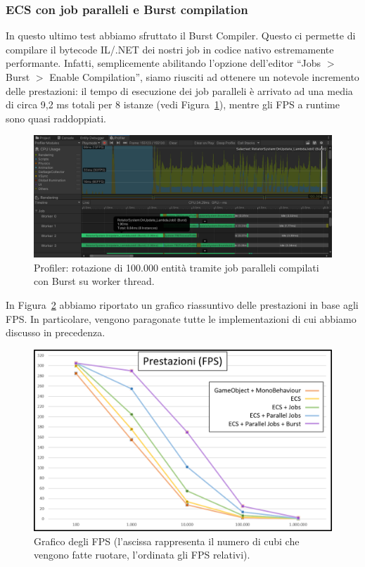 \subsubsection{ECS con job paralleli e Burst compilation}
In questo ultimo test abbiamo sfruttato il Burst Compiler. Questo ci permette di compilare il bytecode IL/.NET dei nostri job in codice nativo estremamente performante. Infatti, semplicemente abilitando l'opzione dell'editor ``Jobs $>$ Burst $>$ Enable Compilation'', siamo riusciti ad ottenere un notevole incremento delle prestazioni: il tempo di esecuzione dei job paralleli è arrivato ad una media di circa 9,2 ms totali per 8 istanze (vedi Figura~\ref{fig:profiler-100k(5)}), mentre gli FPS a runtime sono quasi raddoppiati.

\begin{figure}[!ht]
    \centering
    \includegraphics[width=0.95\columnwidth]{gfx/imgs/chapter5/ProfilerStressTest100k(5).png}
    \caption{Profiler: rotazione di 100.000 entità tramite job paralleli compilati con Burst su worker thread.}
    \label{fig:profiler-100k(5)}
\end{figure}


In Figura~\ref{fig:dati-fps} abbiamo riportato un grafico riassuntivo delle prestazioni in base agli FPS. In particolare, vengono paragonate tutte le implementazioni di cui abbiamo discusso in precedenza.

\begin{figure}[!ht]
    \centering
    \includegraphics[width=0.95\columnwidth]{gfx/imgs/chapter5/FPSGraph.png}
    \caption{Grafico degli FPS (l'ascissa rappresenta il numero di cubi che vengono fatte ruotare, l'ordinata gli FPS relativi).}
    \label{fig:dati-fps}
\end{figure}

